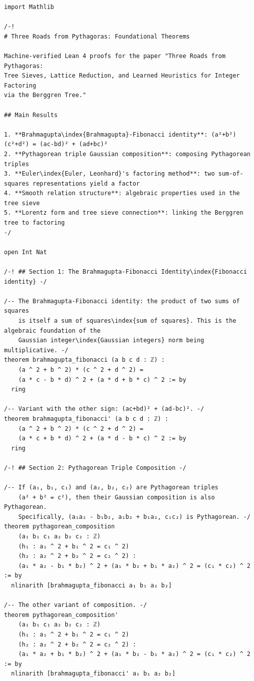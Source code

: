 \documentclass[11pt,openany]{book}
\theoremstyle{definition}
\theoremstyle{plain}
\theoremstyle{remark}
\begin{document}
\begin{lstlisting}[style=lean]
import Mathlib

/-!
# Three Roads from Pythagoras: Foundational Theorems

Machine-verified Lean 4 proofs for the paper "Three Roads from Pythagoras:
Tree Sieves, Lattice Reduction, and Learned Heuristics for Integer Factoring
via the Berggren Tree."

## Main Results

1. **Brahmagupta\index{Brahmagupta}-Fibonacci identity**: (a²+b²)(c²+d²) = (ac-bd)² + (ad+bc)²
2. **Pythagorean triple Gaussian composition**: composing Pythagorean triples
3. **Euler\index{Euler, Leonhard}'s factoring method**: two sum-of-squares representations yield a factor
4. **Smooth relation structure**: algebraic properties used in the tree sieve
5. **Lorentz form and tree sieve connection**: linking the Berggren tree to factoring
-/

open Int Nat

/-! ## Section 1: The Brahmagupta-Fibonacci Identity\index{Fibonacci identity} -/

/-- The Brahmagupta-Fibonacci identity: the product of two sums of squares
    is itself a sum of squares\index{sum of squares}. This is the algebraic foundation of the
    Gaussian integer\index{Gaussian integers} norm being multiplicative. -/
theorem brahmagupta_fibonacci (a b c d : ℤ) :
    (a ^ 2 + b ^ 2) * (c ^ 2 + d ^ 2) =
    (a * c - b * d) ^ 2 + (a * d + b * c) ^ 2 := by
  ring

/-- Variant with the other sign: (ac+bd)² + (ad-bc)². -/
theorem brahmagupta_fibonacci' (a b c d : ℤ) :
    (a ^ 2 + b ^ 2) * (c ^ 2 + d ^ 2) =
    (a * c + b * d) ^ 2 + (a * d - b * c) ^ 2 := by
  ring

/-! ## Section 2: Pythagorean Triple Composition -/

/-- If (a₁, b₁, c₁) and (a₂, b₂, c₂) are Pythagorean triples
    (a² + b² = c²), then their Gaussian composition is also Pythagorean.
    Specifically, (a₁a₂ - b₁b₂, a₁b₂ + b₁a₂, c₁c₂) is Pythagorean. -/
theorem pythagorean_composition
    (a₁ b₁ c₁ a₂ b₂ c₂ : ℤ)
    (h₁ : a₁ ^ 2 + b₁ ^ 2 = c₁ ^ 2)
    (h₂ : a₂ ^ 2 + b₂ ^ 2 = c₂ ^ 2) :
    (a₁ * a₂ - b₁ * b₂) ^ 2 + (a₁ * b₂ + b₁ * a₂) ^ 2 = (c₁ * c₂) ^ 2 := by
  nlinarith [brahmagupta_fibonacci a₁ b₁ a₂ b₂]

/-- The other variant of composition. -/
theorem pythagorean_composition'
    (a₁ b₁ c₁ a₂ b₂ c₂ : ℤ)
    (h₁ : a₁ ^ 2 + b₁ ^ 2 = c₁ ^ 2)
    (h₂ : a₂ ^ 2 + b₂ ^ 2 = c₂ ^ 2) :
    (a₁ * a₂ + b₁ * b₂) ^ 2 + (a₁ * b₂ - b₁ * a₂) ^ 2 = (c₁ * c₂) ^ 2 := by
  nlinarith [brahmagupta_fibonacci' a₁ b₁ a₂ b₂]


\end{lstlisting}
\end{document}
